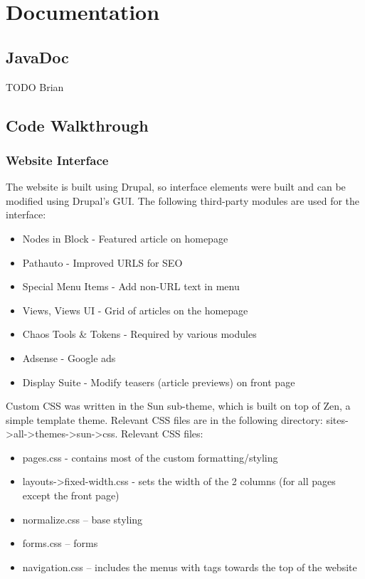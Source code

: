 \documentclass[11pt]{article} %
\begin{document}
\section{Documentation}

\subsection{JavaDoc}

TODO Brian

\subsection{Code Walkthrough}

\subsubsection{Website Interface}

The website is built using Drupal, so interface elements were built and can be modified using Drupal’s GUI. The following third-party modules are used for the interface:

\begin{itemize}
\item Nodes in Block - Featured article on homepage
\item Pathauto - Improved URLS for SEO
\item Special Menu Items - Add non-URL text in menu
\item Views, Views UI - Grid of articles on the homepage
\item Chaos Tools \& Tokens - Required by various modules
\item Adsense - Google ads
\item Display Suite - Modify teasers (article previews) on front page
\end{itemize}

Custom CSS was written in the Sun sub-theme, which is built on top of Zen, a simple template theme. Relevant CSS files are in the following directory: sites-\textgreater all-\textgreater themes-\textgreater sun-\textgreater css.
Relevant CSS files:

\begin{itemize}
\item pages.css - contains most of the custom formatting/styling
\item layouts->fixed-width.css - sets the width of the 2 columns (for all pages except the front page)
\item normalize.css – base styling
\item forms.css – forms
\item navigation.css – includes the menus with tags towards the top of the website
\end{itemize}
\end{document}
